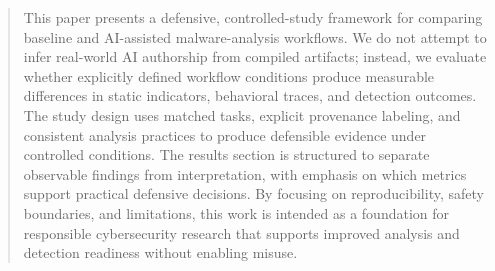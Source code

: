 \begin{abstract}
This paper presents a defensive, controlled-study framework for comparing baseline and
AI-assisted malware-analysis workflows. We do not attempt to infer real-world AI authorship
from compiled artifacts; instead, we evaluate whether explicitly defined workflow conditions
produce measurable differences in static indicators, behavioral traces, and detection outcomes.
The study design uses matched tasks, explicit provenance labeling, and consistent analysis
practices to produce defensible evidence under controlled conditions. The results section is
structured to separate observable findings from interpretation, with emphasis on which metrics
support practical defensive decisions. By focusing on reproducibility, safety boundaries, and
limitations, this work is intended as a foundation for responsible cybersecurity research that
supports improved analysis and detection readiness without enabling misuse.
\end{abstract}
